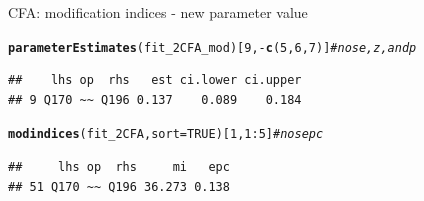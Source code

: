 \documentclass[10pt]{beamer}\usepackage[]{graphicx}\usepackage[]{xcolor}
\makeatletter
\newcommand{\hlnum}[1]{\textcolor[rgb]{0.686,0.059,0.569}{#1}}%
\newcommand{\hlcom}[1]{\textcolor[rgb]{0.678,0.584,0.686}{\textit{#1}}}%
\newcommand{\hlopt}[1]{\textcolor[rgb]{0,0,0}{#1}}%
\newcommand{\hlstd}[1]{\textcolor[rgb]{0.345,0.345,0.345}{#1}}%
\newcommand{\hlkwc}[1]{\textcolor[rgb]{0.333,0.667,0.333}{#1}}%
\newcommand{\hlkwd}[1]{\textcolor[rgb]{0.737,0.353,0.396}{\textbf{#1}}}%
\newenvironment{kframe}{%
 \def\at@end@of@kframe{}%
 \ifinner\ifhmode%
  \def\at@end@of@kframe{\end{minipage}}%
  \begin{minipage}{\columnwidth}%
 \fi\fi%
 \def\FrameCommand##1{\hskip\@totalleftmargin \hskip-\fboxsep
 \colorbox{shadecolor}{##1}\hskip-\fboxsep
     \hskip-\linewidth \hskip-\@totalleftmargin \hskip\columnwidth}%
 \MakeFramed {\advance\hsize-\width
   \@totalleftmargin\z@ \linewidth\hsize
   \@setminipage}}%
 {\par\unskip\endMakeFramed%
 \at@end@of@kframe}
\newenvironment{knitrout}{}{} %
\makeatother
\begin{document}
\begin{frame}[fragile]{CFA: modification indices - new parameter value}

\begin{knitrout}
\color{fgcolor}\begin{kframe}
\begin{alltt}
\hlkwd{parameterEstimates}\hlstd{(fit_2CFA_mod)[}\hlnum{9}\hlstd{,}\hlopt{-}\hlkwd{c}\hlstd{(}\hlnum{5}\hlstd{,}\hlnum{6}\hlstd{,}\hlnum{7}\hlstd{)]} \hlcom{# no se, z, and p}
\end{alltt}
\begin{verbatim}
##    lhs op  rhs   est ci.lower ci.upper
## 9 Q170 ~~ Q196 0.137    0.089    0.184
\end{verbatim}
\end{kframe}
\end{knitrout}

\begin{knitrout}
\color{fgcolor}\begin{kframe}
\begin{alltt}
\hlkwd{modindices}\hlstd{(fit_2CFA,} \hlkwc{sort} \hlstd{=} \hlnum{TRUE}\hlstd{)[}\hlnum{1}\hlstd{,}\hlnum{1}\hlopt{:}\hlnum{5}\hlstd{]} \hlcom{# no sepc }
\end{alltt}
\begin{verbatim}
##     lhs op  rhs     mi   epc
## 51 Q170 ~~ Q196 36.273 0.138
\end{verbatim}
\end{kframe}
\end{knitrout}

\end{frame}
%
\end{document}
